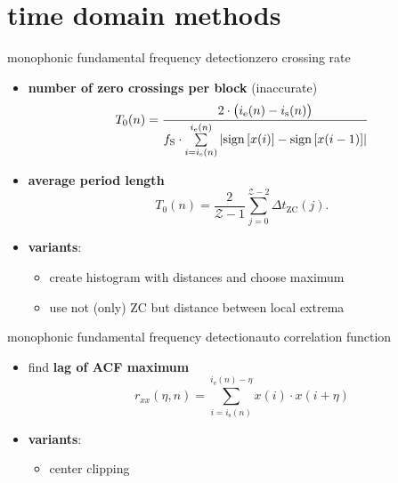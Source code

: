 	\section[time domain]{time domain methods}
	\begin{frame}{monophonic fundamental frequency detection}{zero crossing rate}
		\begin{itemize}
			\item	\textbf{number of zero crossings per block} (inaccurate)
				\begin{equation*}
					T_0(n) = \frac{2\cdot \big(i_{\mathrm{e}}(n)-i_{\mathrm{s}}(n)\big)}{f_{\mathrm{S}}\cdot\sum\limits_{i=i_{\mathrm{s}}(n)}^{i_{\mathrm{e}}(n)}{\left|\operatorname*{sign} \left[x(i)\right]-\operatorname*{sign} \left[x(i-1)\right]\right|}} 
				\end{equation*}
			\item<2->	\textbf{average period length}
				\begin{equation*}
					T_0(n) = \frac{2}{\mathcal{Z}-1}\sum\limits_{j=0}^{\mathcal{Z}-2}{\Delta t_\mathrm{ZC}(j)}.
				\end{equation*}
			\item<3->	\textbf{variants}:
				\begin{itemize}
					\item	create histogram with distances and choose maximum
					\item	use not (only) ZC but distance between local extrema
				\end{itemize}
		\end{itemize}
	\end{frame}
	
	\begin{frame}{monophonic fundamental frequency detection}{auto correlation function}
		\vspace{-2mm}
        \begin{itemize}
            \item find \textbf{lag of ACF maximum}
                \begin{equation*}
                    r_{xx}(\eta,n) = \sum\limits_{i=i_{\mathrm{s}}(n)}^{i_{\mathrm{e}}(n)-\eta}{x(i)\cdot x(i+\eta)}
                \end{equation*}
            \item<2->     \textbf{variants}:
                \begin{itemize}
                    \item<3->	center clipping
                            \begin{figure}
                                \centering
                                
                                \label{fig:centerclipping}
                            \end{figure}
                \end{itemize}
        \end{itemize}
		
            
	\end{frame}
	
